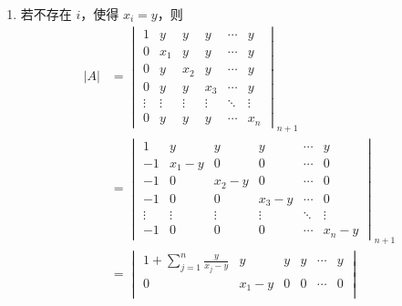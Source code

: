 \documentclass[12pt,fontset=fandol]{ctexart}
\begin{document}
\begin{solve}
\begin{enumerate}
\begin{enumerate}
                            \item 若不存在 $i$，使得 $x_i = y$，则
                                \begin{align*}
                                    |A| &= \begin{vmatrix}
                                        1      & y      & y      & y      & \cdots & y      \\
                                        0      & x_1    & y      & y      & \cdots & y      \\
                                        0      & y      & x_2    & y      & \cdots & y      \\
                                        0      & y      & y      & x_3    & \cdots & y      \\
                                        \vdots & \vdots & \vdots & \vdots & \ddots & \vdots \\
                                        0      & y      & y      & y      & \cdots & x_n
                                    \end{vmatrix}_{n+1} \\
                                    &= \begin{vmatrix}
                                        1      & y      & y      & y      & \cdots & y      \\
                                        -1     & x_1-y  & 0      & 0      & \cdots & 0      \\
                                        -1     & 0      & x_2-y  & 0      & \cdots & 0      \\
                                        -1     & 0      & 0      & x_3-y  & \cdots & 0      \\
                                        \vdots & \vdots & \vdots & \vdots & \ddots & \vdots \\
                                        -1     & 0      & 0      & 0      & \cdots & x_n-y
                                    \end{vmatrix}_{n+1} \\
                                    &= \begin{vmatrix}
                                        1 + \sum_{j=1}^n \frac{y}{x_j-y} & y      & y      & y      & \cdots & y      \\
                                        0                                & x_1-y  & 0      & 0      & \cdots & 0      \\

\end{vmatrix}
\end{align*}
\end{enumerate}
\end{enumerate}
\end{solve}
\end{document}
